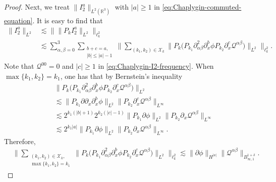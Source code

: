 \documentclass[11pt,twoside]{article}
\def\cQ{\mathcal Q}
\def\ls{\lesssim}
\theoremstyle{plain}
\theoremstyle{definition}
\theoremstyle{assumption}
\numberwithin{equation}{section}
\begin{document}
\begin{proof}
		
		Next, we treat $\|I_2^a\|_{L^2(\mathbb R^3)}$ with $|a|\ge1$ in
		\eqref{eq:Chaplygin-commuted-equation}. It is easy to find that
		\begin{equation}\label{eq:Chaplygin-I2-frequency}
			\begin{aligned}
				\|I_2^a\|_{L^2}
				&\ls
				\big\|
				\|P_kI_2^a\|_{L^2}
				\big\|_{\ell_k^2}\\
				&\ls
				\sum_{\alpha,\beta=0}^3
				\sum_{\substack{b+c=a,\\ |b|\le |a|-1}}
				\big\|
				\sum_{(k_1,k_2)\in\mathcal X_k}
				\big\|
				P_k
				\big(
				P_{k_1}\partial_{\alpha\beta}^2\partial_x^b\phi
				P_{k_2}\partial_x^c\cQ^{\alpha\beta}
				\big)
				\big\|_{L^2}
				\big\|_{\ell_k^2}.
			\end{aligned}
		\end{equation}
		Note that $\cQ^{00}=0$ and $|c|\ge1$ in \eqref{eq:Chaplygin-I2-frequency}. When
		$\max\{k_1,k_2\}=k_1$, one has that by Bernstein's inequality
		\begin{equation}\label{eq:Chaplygin-I2-first-frequency-case}
			\begin{aligned}
				&
				\big\|
				P_k
				\big(
				P_{k_1}\partial_{\alpha\beta}^2\partial_x^b\phi
				P_{k_2}\partial_x^c\cQ^{\alpha\beta}
				\big)
				\big\|_{L^2}
				\\
				&\ls
				\|P_{k_1}\partial\partial_x\partial_x^b\phi\|_{L^2}
				\|P_{k_2}\partial_x^c\cQ^{\alpha\beta}\|_{L^\infty}
				\\
				&\ls
				2^{k_1(|b|+1)}
				2^{k_2(|c|-1)}
				\|P_{k_1}\partial\phi\|_{L^2}
				\|P_{k_2}\partial_x\cQ^{\alpha\beta}\|_{L^\infty}
				\\
				&\ls
				2^{k_1|a|}
				\|P_{k_1}\partial\phi\|_{L^2}
				\|P_{k_2}\partial_x\cQ^{\alpha\beta}\|_{L^\infty}.
			\end{aligned}
		\end{equation}
		Therefore,
		\begin{equation}\label{eq:Chaplygin-I2-first-frequency-sum}
			\begin{aligned}
				&
				\big\|
				\sum_{\substack{(k_1,k_2)\in\mathcal X_k,\\
				\max\{k_1,k_2\}=k_1}}
				\big\|
				P_k
				\big(
				P_{k_1}\partial_{\alpha\beta}^2\partial_x^b\phi
				P_{k_2}\partial_x^c\cQ^{\alpha\beta}
				\big)
				\big\|_{L^2}
				\big\|_{\ell_k^2}
				\ls
				\|\partial\phi\|_{H^{|a|}}
				\|\cQ^{\alpha\beta}\|_{B_{\infty,1}^{1+\delta}}.
			\end{aligned}
		\end{equation}

\end{proof}
\end{document}
